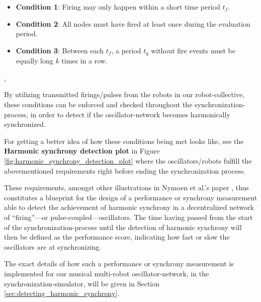 	\begin{itemize}
		\item[] \textbf{Condition 1}: Firing may only happen within a short time period $t_f$.
		\item[] \textbf{Condition 2}: All nodes must have fired at least once during the evaluation period.
		\item[] \textbf{Condition 3}: Between each $t_f$, a period $t_q$ without fire events must be equally long $k$ times in a row.
	\end{itemize}
	\sep
	
	By utilizing transmitted firings/pulses from the robots in our robot-collective, these conditions can be enforced and checked throughout the synchronization-process, in order to detect if the oscillator-network becomes harmonically synchronized.
	
	For getting a better idea of how these conditions being met looks like, see the \textbf{Harmonic synchrony detection plot} in Figure \ref{fig:harmonic_synchrony_detection_plot} where the oscillators/robots fulfill the abovementioned requirements right before ending the synchronization process.
	
	These requirements, amongst other illustrations in Nymoen et al.'s paper \cite{nymoen_synch}, thus constitutes a blueprint for the design of a performance or synchrony measurement able to detect the achievement of harmonic synchrony in a decentralized network of ``firing''—or pulse-coupled—oscillators. The time having passed from the start of the synchronization-process until the detection of harmonic synchrony will then be defined as the performance score, indicating how fast or slow the oscillators are at synchronizing.
	
	The exact details of how such a performance or synchrony measurement is implemented for our musical multi-robot oscillator-network, in the synchronization-simulator, will be given in Section \ref{sec:detecting_harmonic_synchrony}.
	
